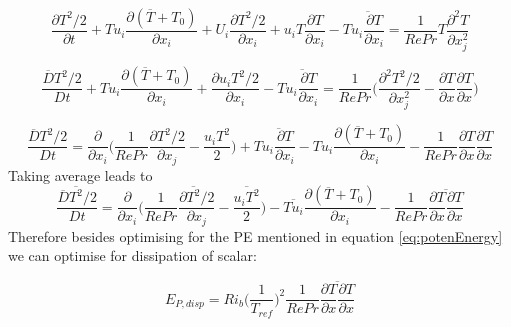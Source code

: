\documentclass[preprint,12pt]{article}
\begin{document}
\begin{equation}
\frac{\partial {T^2/2}}{\partial t}+Tu_i\frac{\partial (\overline{T}+T_0)}{\partial x_i}+U_i\frac{\partial {T^2/2}}{\partial x_i}+u_iT\frac{\partial {T}}{\partial x_i}-T\overline{{u_i}\frac{\partial {T}}{\partial x_i}}=\frac{1}{Re Pr}T\frac{\partial^2T}{\partial x_j^2}
\end{equation}

\begin{equation}
\frac{\overline{D} {T^2/2}}{D t}+Tu_i\frac{\partial (\overline{T}+T_0)}{\partial x_i}+\frac{\partial {u_iT^2/2}}{\partial x_i}-T\overline{{u_i}\frac{\partial {T}}{\partial x_i}}=\frac{1}{Re Pr}\Big(\frac{\partial^2T^2/2}{\partial x_j^2}-\frac{\partial T}{\partial x}\frac{\partial T}{\partial x}\Big)
\end{equation}

\begin{equation}
\frac{\overline{D} {T^2/2}}{D t}=\frac{\partial}{\partial x_i}\Bigg(\frac{1}{Re Pr}\frac{\partial T^2/2}{\partial x_j}-\frac {u_iT^2}{2}\Bigg)+T\overline{{u_i}\frac{\partial {T}}{\partial x_i}}-Tu_i\frac{\partial (\overline{T}+T_0)}{\partial x_i}-\frac{1}{Re Pr}\frac{\partial T}{\partial x}\frac{\partial T}{\partial x}
\end{equation}
Taking average leads to
\begin{equation}
\frac{\overline{D} {\overline{T^2}/2}}{D t}=\frac{\partial}{\partial x_i}\Bigg(\frac{1}{Re Pr}\frac{\partial \overline{T^2}/2}{\partial x_j}-\frac {\overline{u_iT^2}}{2}\Bigg)-\overline{Tu_i}\frac{\partial (\overline{T}+T_0)}{\partial x_i}-\frac{1}{Re Pr}\overline{\frac{\partial T}{\partial x}\frac{\partial T}{\partial x}}
\end{equation}
Therefore besides optimising for the PE mentioned in equation \eqref{eq:potenEnergy} we can optimise for dissipation of scalar:
\begin{tcolorbox}
\begin{equation}
E_{P,disp}=Ri_b\Big(\frac{1}{T_{ref}}\Big)^2\frac{1}{RePr}\overline{\frac{\partial T}{\partial x}\frac{\partial T}{\partial x}}
\end{equation}
\end{tcolorbox}
%
\end{document}
